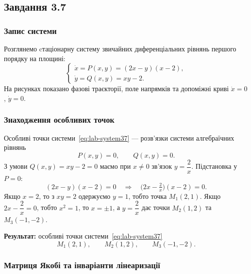 \subsection{Завдання 3.7}

\subsubsection{Запис системи}

Розглянемо cтаціонарну систему звичайних диференціальних рівнянь першого порядку на площині:
\begin{equation}\label{eq:lab-system37}
\begin{cases}
\dot{x} = P(x,y) = (2x-y)(x-2),\\
\dot{y} = Q(x,y) = xy - 2.
\end{cases}
\end{equation}
На рисунках показано фазові траєкторії, поле напрямків та допоміжні криві $\dot{x}=0$, $\dot{y}=0$.

\subsubsection{Знаходження особливих точок}

Особливі точки системи~\eqref{eq:lab-system37} --- розв'язки системи алгебраїчних рівнянь
\begin{equation*}
P(x,y)=0,\qquad Q(x,y)=0.
\end{equation*}
З умови $Q(x,y)= xy-2 = 0$ маємо при $x\neq 0$ зв'язок $y=\dfrac{2}{x}$.
Підстановка у $P=0$:
\begin{equation*}
(2x-y)(x-2)=0 \quad \Rightarrow \quad \bigl(2x-\tfrac{2}{x}\bigr)(x-2)=0.
\end{equation*}
Якщо $x=2$, то з $xy=2$ одержуємо $y=1$, тобто точка $M_1(2,1)$.
Якщо $2x-\dfrac{2}{x}=0$, тобто $x^2=1$, то $x=\pm 1$, а $y=\dfrac{2}{x}$ дає точки $M_2(1,2)$ та $M_3(-1,-2)$.

\textbf{Результат:} особливі точки системи~\eqref{eq:lab-system37}
\begin{equation*}
M_1(2,1),\qquad M_2(1,2),\qquad M_3(-1,-2).
\end{equation*}

\subsubsection{Матриця Якобі та інваріанти лінеаризації}


